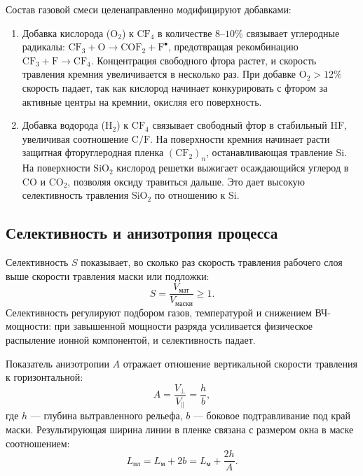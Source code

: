 \documentclass[12pt,a4paper]{article}
\theoremstyle{plain}
\theoremstyle{definition}
\theoremstyle{remark}
\numberwithin{equation}{section}
\begin{document}
Состав газовой смеси целенаправленно модифицируют добавками:
\begin{enumerate}
  \item Добавка кислорода ($\mathrm{O}_2$) к $\mathrm{CF}_4$ в количестве $8\text{--}10\%$ связывает углеродные радикалы: $\mathrm{CF}_3 + \mathrm{O} \to \mathrm{COF}_2 + \mathrm{F}^\bullet$, предотвращая рекомбинацию $\mathrm{CF}_3 + \mathrm{F} \to \mathrm{CF}_4$. Концентрация свободного фтора растет, и скорость травления кремния увеличивается в несколько раз. При добавке $\mathrm{O}_2 > 12\%$ скорость падает, так как кислород начинает конкурировать с фтором за активные центры на кремнии, окисляя его поверхность.
  \item Добавка водорода ($\mathrm{H}_2$) к $\mathrm{CF}_4$ связывает свободный фтор в стабильный $\mathrm{HF}$, увеличивая соотношение $\mathrm{C}/\mathrm{F}$. На поверхности кремния начинает расти защитная фторуглеродная пленка $(\mathrm{CF}_2)_n$, останавливающая травление $\mathrm{Si}$. На поверхности $\mathrm{SiO}_2$ кислород решетки выжигает осаждающийся углерод в $\mathrm{CO}$ и $\mathrm{CO}_2$, позволяя оксиду травиться дальше. Это дает высокую селективность травления $\mathrm{SiO}_2$ по отношению к $\mathrm{Si}$.
\end{enumerate}

\subsection{Селективность и анизотропия процесса}

Селективность $S$ показывает, во сколько раз скорость травления рабочего слоя выше скорости травления маски или подложки:
\begin{equation*}
  S = \frac{V_\text{мат}}{V_\text{маски}} \ge 1.
\end{equation*}
Селективность регулируют подбором газов, температурой и снижением ВЧ-мощности: при завышенной мощности разряда усиливается физическое распыление ионной компонентой, и селективность падает.

Показатель анизотропии $A$ отражает отношение вертикальной скорости травления к горизонтальной:
\begin{equation*}
  A = \frac{V_\perp}{V_\parallel} = \frac{h}{b},
\end{equation*}
где $h$ --- глубина вытравленного рельефа, $b$ --- боковое подтравливание под край маски. Результирующая ширина линии в пленке связана с размером окна в маске соотношением:
\begin{equation*}
  L_\text{пл} = L_\text{м} + 2b = L_\text{м} + \frac{2h}{A}.
\end{equation*}
\end{document}
